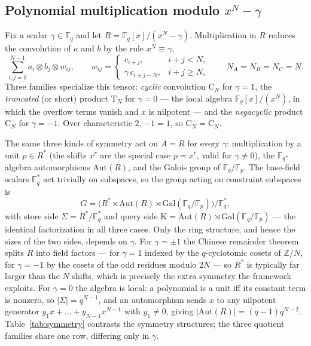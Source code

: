 \documentclass[11pt]{article}
\theoremstyle{definition}
\newcommand{\F}{\mathbb{F}}
\newcommand{\Cyct}[1]{\mathrm{C}_{#1}}
\newcommand{\Trunct}[1]{\mathrm{T}_{#1}}
\newcommand{\Negat}[1]{\mathrm{C}^{-}_{#1}}
\newcommand{\Gal}{\mathrm{Gal}}
\newcommand{\Aut}{\mathrm{Aut}}
\newcommand{\Kappa}{\mathrm{K}}
\begin{document}
\subsection{Polynomial multiplication modulo $x^N-\gamma$}

Fix a scalar $\gamma\in\F_q$ and let $R=\F_q[x]/(x^N-\gamma)$. Multiplication in $R$
reduces the convolution of $a$ and $b$ by the rule $x^N\equiv\gamma$,
\[
  \sum_{i,j=0}^{N-1} a_i\otimes b_j\otimes w_{ij},\qquad
  w_{ij}=
  \begin{cases} c_{i+j},           & i+j<N,    \\[2pt]
    \gamma\,c_{i+j-N}, & i+j\ge N,
  \end{cases}
  \qquad N_A=N_B=N_C=N.
\]
Three families specialize this tensor: \emph{cyclic} convolution $\Cyct{N}$ for
$\gamma=1$, the \emph{truncated} (or short) product $\Trunct{N}$ for $\gamma=0$ ---
the local algebra $\F_q[x]/(x^N)$, in which the overflow terms vanish and $x$ is
nilpotent --- and the \emph{negacyclic} product $\Negat{N}$ for $\gamma=-1$. Over
characteristic $2$, $-1=1$, so $\Negat{N}=\Cyct{N}$.

The same three kinds of symmetry act on $A=R$ for every $\gamma$: multiplication by a
unit $p\in R^*$ (the shifts $x^r$ are the special case $p=x^r$, valid for
$\gamma\ne 0$), the $\F_q$-algebra automorphisms $\Aut(R)$, and the Galois group of
$\F_q/\F_p$. The base-field scalars $\F_q^*$ act trivially on subspaces, so the group
acting on constraint subspaces is
\[
  G = \bigl(R^*\rtimes \Aut(R) \rtimes \Gal(\F_q/\F_p)\bigr)/\F_q^*,
\]
with store side $\Sigma=R^*/\F_q^*$ and query side
$\Kappa=\Aut(R)\rtimes\Gal(\F_q/\F_p)$ --- the identical factorization in all three
cases. Only the ring structure, and hence the sizes of the two sides, depends on
$\gamma$. For $\gamma=\pm1$ the Chinese remainder theorem splits $R$ into field
factors --- for $\gamma=1$ indexed by the $q$-cyclotomic cosets of $\mathbb{Z}/N$,
for $\gamma=-1$ by the cosets of the odd residues modulo $2N$ --- so $R^*$ is
typically far larger than the $N$ shifts, which is precisely the extra symmetry the
framework exploits. For $\gamma=0$ the algebra is local: a polynomial is a unit iff
its constant term is nonzero, so $|\Sigma|=q^{N-1}$, and an automorphism sends $x$ to
any nilpotent generator $y_1x+\dots+y_{N-1}x^{N-1}$ with $y_1\ne 0$, giving
$|\Aut(R)|=(q-1)q^{N-2}$. Table~\ref{tab:symmetry} contrasts the symmetry
structures; the three quotient families share one row, differing only in $\gamma$.
\end{document}
